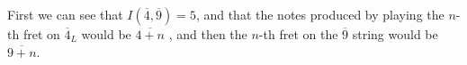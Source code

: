 \documentclass[preview]{standalone}
\begin{document}
\begin{center}
First we can see that $I(\overline{4}, \overline{9}) = 5$, and that the notes produced by playing the $n$-th fret on $\overline{4}_L$ would be $\overline{4 + n}$ , and then the $n$-th fret on the $\overline{9}$ string would be $ \overline{9 + n}$.
\end{center}
\end{document}
